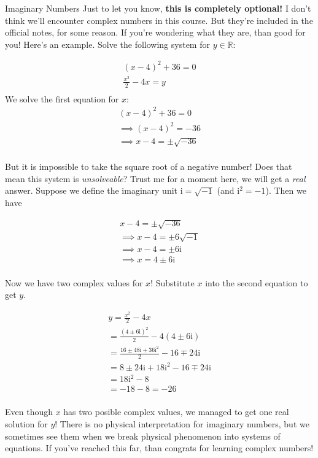 \begin{boxremark*}{Imaginary Numbers}{}
	Just to let you know, {\bf this is completely optional!} I don't think we'll encounter complex numbers in this course. But they're included in the official notes, for some reason. If you're wondering what they are, than good for you! Here's an example. Solve the following system for $y \in \mathbb{R}$:

	\begin{align*}
		(x-4)^2+36=0\\
		\frac{x^2}{2}-4x=y\\
	\end{align*}
	We solve the first equation for $x$:
	\begin{align*}
		(x-4)^2+36=0\\
		\implies (x-4)^2=-36\\
		\implies x-4=\pm\sqrt{-36}\\
	\end{align*}

	But it is impossible to take the square root of a negative number! Does that mean this system is \emph{unsolveable}? Trust me for a moment here, we will get a \emph{real} answer. Suppose we define the imaginary unit $\mathrm{i} = \sqrt{-1}$ (and $\mathrm{i}^2=-1$). Then we have

	\begin{align*}
		x-4=\pm\sqrt{-36}\\
		\implies x-4=\pm6\sqrt{-1}\\
		\implies x-4=\pm6\mathrm{i}\\
		\implies x=4\pm6\mathrm{i}\\
	\end{align*}

	Now we have two complex values for $x$! Substitute $x$ into the second equation to get $y$.

	\begin{align*}
		y=\frac{x^2}{2}-4x\\
		=\frac{(4\pm6\mathrm{i})^2}{2}-4(4\pm6\mathrm{i})\\
		=\frac{16\pm48\mathrm{i}+36\mathrm{i}^2}{2}-16\mp24\mathrm{i}\\
		=8\pm24\mathrm{i}+18\mathrm{i}^2-16\mp24\mathrm{i}\\
		=18\mathrm{i}^2-8\\
		=-18-8=-26\\
	\end{align*}

	Even though $x$ has two posible complex values, we managed to get one real solution for $y$! There is no physical interpretation for imaginary numbers, but we sometimes see them when we break physical phenomenon into systems of equations. If you've reached this far, than congrats for learning complex numbers!
\end{boxremark*}

